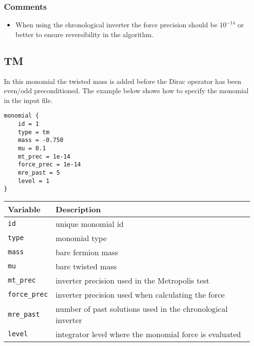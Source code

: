 \documentclass[12pt]{article}
\begin{document}
\subsubsection*{Comments}
\begin{itemize}
 \item When using the chronological inverter the force precision should be $10^{-14}$ or better to ensure reversibility in the algorithm.
\end{itemize}

\newpage
\subsection*{TM}
In this monomial the twisted mass is added before the Dirac operator has been even/odd preconditioned. The example below shows how to specify the monomial in the input file.
\begin{center}
\begin{minipage}{55mm}
\begin{framed}
\begin{verbatim}
monomial {
    id = 1
    type = tm
    mass = -0.750
    mu = 0.1
    mt_prec = 1e-14
    force_prec = 1e-14
    mre_past = 5
    level = 1
}
\end{verbatim}
\vspace{-5mm}
\end{framed}
\end{minipage}
\end{center}

\vspace{2mm}

\begin{center}
\begin{tabular}{l|l}
 Variable & Description \\
 \hline
 \verb|id|         & unique monomial id \\
 \verb|type|       & monomial type \\
 \verb|mass|       & bare fermion mass \\
 \verb|mu|         & bare twisted mass\\
 \verb|mt_prec|    & inverter precision used in the Metropolis test \\
 \verb|force_prec| & inverter precision used when calculating the force \\
 \verb|mre_past|   & number of past solutions used in the chronological inverter \\
 \verb|level|      & integrator level where the monomial force is evaluated
\end{tabular}
\end{center}
\end{document}
